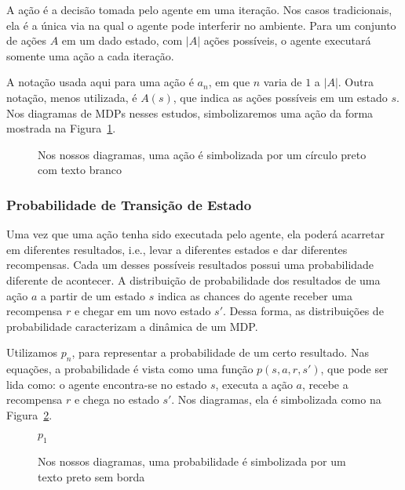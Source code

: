 \documentclass{article}
\begin{document}
                A ação é a decisão tomada pelo agente em uma iteração. Nos casos tradicionais, ela é a única via na qual o agente pode interferir no ambiente. Para um conjunto de ações $A$ em um dado estado, com $\vert A \vert$ ações possíveis, o agente executará somente uma ação a cada iteração.

                A notação usada aqui para uma ação é $a_n$, em que $n$ varia de $1$ a $\vert A \vert$. Outra notação, menos utilizada, é $A(s)$, que indica as ações possíveis em um estado $s$. Nos diagramas de MDPs nesses estudos, simbolizaremos uma ação da forma mostrada na Figura~\ref{diag:action-node}.

                \begin{figure}[ht]
                    \centering
                    \caption{Nos nossos diagramas, uma ação é simbolizada por um círculo preto com texto branco}
                    \label{diag:action-node}
                \end{figure}
                
            \subsubsection{Probabilidade de Transição de Estado}

                Uma vez que uma ação tenha sido executada pelo agente, ela poderá acarretar em diferentes resultados, i.e., levar a diferentes estados e dar diferentes recompensas. Cada um desses possíveis resultados possui uma probabilidade diferente de acontecer. A distribuição de probabilidade dos resultados de uma ação $a$ a partir de um estado $s$ indica as chances do agente receber uma recompensa $r$ e chegar em um novo estado $s'$. Dessa forma, as distribuições de probabilidade caracterizam a dinâmica de um MDP.

                Utilizamos $p_n$, para representar a probabilidade de um certo resultado. Nas equações, a probabilidade é vista como uma função $p(s, a, r, s')$, que pode ser lida como: o agente encontra-se no estado $s$, executa a ação $a$, recebe a recompensa $r$ e chega no estado $s'$. Nos diagramas, ela é simbolizada como na Figura~\ref{diag:prob-label}.

                \begin{figure}[ht]
                    \centering
                    $p_1$\\
                    \caption{Nos nossos diagramas, uma probabilidade é simbolizada por um texto preto sem borda}
                    \label{diag:prob-label}
                \end{figure}
                
\end{document}
